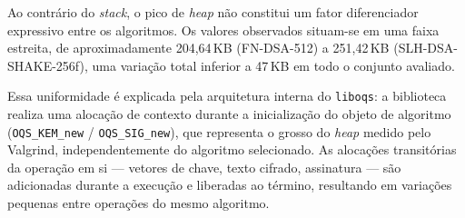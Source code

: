 \begin{table}[ht]
\centering
\caption{Pico de \textit{heap} por esquema de assinatura
digital e operação (KB).
Medido com \texttt{valgrind --tool=massif}; valor de pico
de \texttt{mem\_heap\_B} para cada operação isolada.}
\label{tab:heap_sig}
\end{table}

Ao contrário do \textit{stack}, o pico de \textit{heap} não
constitui um fator diferenciador expressivo entre os algoritmos.
Os valores observados situam-se em uma faixa estreita, de
aproximadamente 204,64\,KB (FN-DSA-512) a 251,42\,KB
(SLH-DSA-SHAKE-256f), uma variação total inferior a 47\,KB
em todo o conjunto avaliado.

Essa uniformidade é explicada pela arquitetura interna do
\texttt{liboqs}: a biblioteca realiza uma alocação de contexto
durante a inicialização do objeto de algoritmo
(\texttt{OQS\_KEM\_new} / \texttt{OQS\_SIG\_new}), que
representa o grosso do \textit{heap} medido pelo Valgrind,
independentemente do algoritmo selecionado.
As alocações transitórias da operação em si — vetores de chave,
texto cifrado, assinatura — são adicionadas durante a execução
e liberadas ao término, resultando em variações pequenas
entre operações do mesmo algoritmo.


